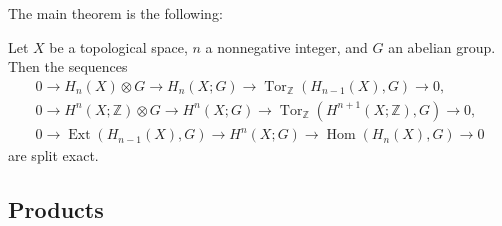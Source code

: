 \documentclass[10pt]{article}
\providecommand{\ZZ}{\mathbb Z}
\providecommand{\opname}{\operatorname}
\providecommand{\Ext}{\opname{Ext}}
\providecommand{\Tor}{\opname{Tor}}
\newcommand{\tensor}{\otimes}
\newcommand{\Hom}{\opname{Hom}}
\begin{document}

The main theorem is the following:
\begin{theorem}
    \label{thm:universal-coefficients}
    Let $X$ be a topological space, $n$ a nonnegative integer,
    and $G$ an abelian group. Then the sequences
    \begin{gather*}
	0\to H_n(X)\tensor G \to H_n(X ; G)\to\Tor_\ZZ(H_{n-1}(X),G)\to 0,\\
	0\to H^n(X;\ZZ)\tensor G \to H^n(X; G)
	\to\Tor_\ZZ(H^{n+1}(X;\ZZ),G)\to 0,\\
	0\to\Ext(H_{n-1}(X),G)\to H^n(X; G)\to\Hom(H_n(X),G)\to 0
    \end{gather*}
    are split exact.
\end{theorem}

\subsection{Products}
\end{document}
